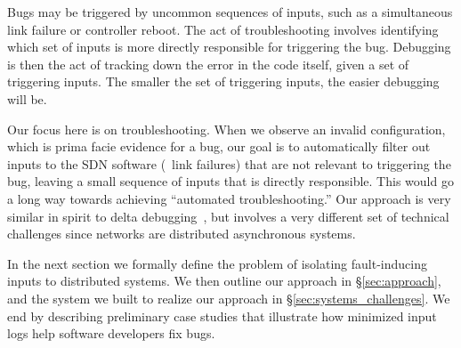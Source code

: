 Bugs may be triggered by uncommon sequences of inputs, such as a simultaneous link failure or controller reboot.
The act of troubleshooting involves identifying which set of inputs is more directly responsible for triggering the bug.
Debugging is then the act of tracking down the error in the code itself, given a
set of triggering inputs.
The smaller the set of triggering inputs, the easier debugging will be.

Our focus here is on troubleshooting. When we observe an invalid
configuration,
which is prima facie evidence for a bug, our goal is
to automatically filter out inputs to the SDN software (\eg~link failures)
that are not relevant to triggering the bug, leaving a small sequence of inputs
that is directly responsible.
This would go a long way towards achieving ``automated troubleshooting.'' Our approach is very similar in spirit to delta debugging~\cite{Zeller:1999:YMP:318773.318946}, but involves a very different set of technical challenges since networks are distributed asynchronous systems.

In the next section we formally define the problem of isolating fault-inducing
inputs to distributed systems. We then outline our approach in
\S\ref{sec:approach}, and the
system we built to realize our approach in \S\ref{sec:systems_challenges}.
We end by describing preliminary case studies that illustrate how minimized
input logs help software developers fix bugs.

